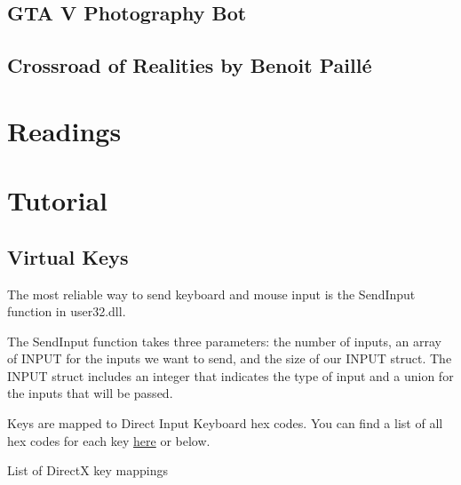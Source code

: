\documentclass[
  openany]{book}
\begin{document}
\hypertarget{gta-v-photography-bot}{%
\subsection*{GTA V Photography Bot}\label{gta-v-photography-bot}}

\hypertarget{crossroad-of-realities-by-benoit-pailluxe9}{%
\subsection*{Crossroad of Realities by Benoit Paillé}\label{crossroad-of-realities-by-benoit-pailluxe9}}

\hypertarget{readings-7}{%
\section*{Readings}\label{readings-7}}

\hypertarget{tutorial-7}{%
\section*{Tutorial}\label{tutorial-7}}

\hypertarget{virtual-keys}{%
\subsection*{Virtual Keys}\label{virtual-keys}}

The most reliable way to send keyboard and mouse input is the SendInput function in user32.dll.

The SendInput function takes three parameters: the number of inputs, an array of INPUT for the inputs we want to send, and the size of our INPUT struct. The INPUT struct includes an integer that indicates the type of input and a union for the inputs that will be passed.

Keys are mapped to Direct Input Keyboard hex codes. You can find a list of all hex codes for each key \href{http://www.flint.jp/misc/?q=dik\&lang=en}{here} or below.

List of DirectX key mappings
\end{document}
